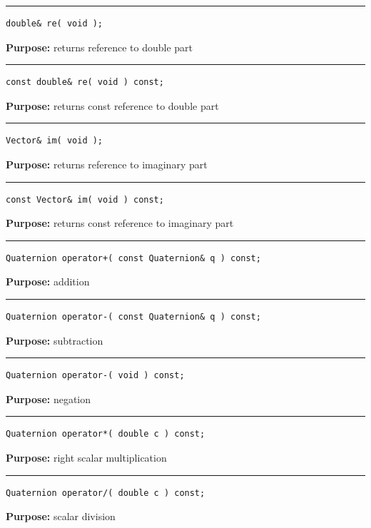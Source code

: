\documentclass{article}
\begin{document}
\hspace{-.21in}\rule{5in}{1pt}
\begin{verbatim}
double& re( void );
\end{verbatim}
\textbf{Purpose:}
returns reference to double part

\hspace{-.21in}\rule{5in}{1pt}
\begin{verbatim}
const double& re( void ) const;
\end{verbatim}
\textbf{Purpose:}
returns const reference to double part

\hspace{-.21in}\rule{5in}{1pt}
\begin{verbatim}
Vector& im( void );
\end{verbatim}
\textbf{Purpose:}
returns reference to imaginary part

\hspace{-.21in}\rule{5in}{1pt}
\begin{verbatim}
const Vector& im( void ) const;
\end{verbatim}
\textbf{Purpose:}
returns const reference to imaginary part

\hspace{-.21in}\rule{5in}{1pt}
\begin{verbatim}
Quaternion operator+( const Quaternion& q ) const;
\end{verbatim}
\textbf{Purpose:}
addition

\hspace{-.21in}\rule{5in}{1pt}
\begin{verbatim}
Quaternion operator-( const Quaternion& q ) const;
\end{verbatim}
\textbf{Purpose:}
subtraction

\hspace{-.21in}\rule{5in}{1pt}
\begin{verbatim}
Quaternion operator-( void ) const;
\end{verbatim}
\textbf{Purpose:}
negation

\hspace{-.21in}\rule{5in}{1pt}
\begin{verbatim}
Quaternion operator*( double c ) const;
\end{verbatim}
\textbf{Purpose:}
right scalar multiplication

\hspace{-.21in}\rule{5in}{1pt}
\begin{verbatim}
Quaternion operator/( double c ) const;
\end{verbatim}
\textbf{Purpose:}
scalar division
\end{document}
